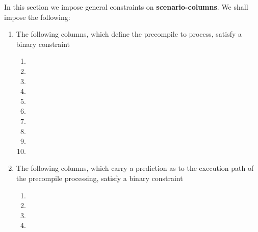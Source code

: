 \begin{center}
\end{center}
In this section we impose general constraints on \textbf{scenario-columns}. We shall impose the following:
\begin{enumerate}
	\item The following columns, which define the precompile to process, satisfy a binary constraint \lispDone{}
		\begin{enumerate}
			\item \scenEcrecover{}
			\item \scenShaTwo{}
			\item \scenRipemd{}
			\item \scenIdentity{}
			\item \scenModexp{}
			\item \scenEcadd{}
			\item \scenEcmul{}
			\item \scenEcpairing{}
			\item \scenBlake{}
			\item \scenPointEvaluation{}
		\end{enumerate}
	\item The following columns, which carry a prediction as to the execution path of the precompile processing, satisfy a binary constraint \lispDone{}
		\begin{enumerate}[resume]
			\item \scenPrcFailureKnownToHub{}
			\item \scenPrcFailureKnownToRam{}
			\item \scenPrcSuccessWillRevert{}
			\item \scenPrcSuccessWontRevert{}
		\end{enumerate}
\end{enumerate}
